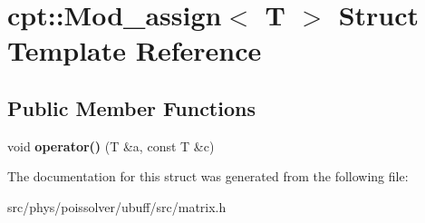 \hypertarget{structcpt_1_1Mod__assign}{}\section{cpt\+:\+:Mod\+\_\+assign$<$ T $>$ Struct Template Reference}
\label{structcpt_1_1Mod__assign}
\subsection*{Public Member Functions}
\begin{DoxyCompactItemize}
\item 
void {\bfseries operator()} (T \&a, const T \&c)\hypertarget{structcpt_1_1Mod__assign_a9acdc28363cdde86854681546b1687b0}{}\label{structcpt_1_1Mod__assign_a9acdc28363cdde86854681546b1687b0}

\end{DoxyCompactItemize}


The documentation for this struct was generated from the following file\+:\begin{DoxyCompactItemize}
\item 
src/phys/poissolver/ubuff/src/matrix.\+h\end{DoxyCompactItemize}

